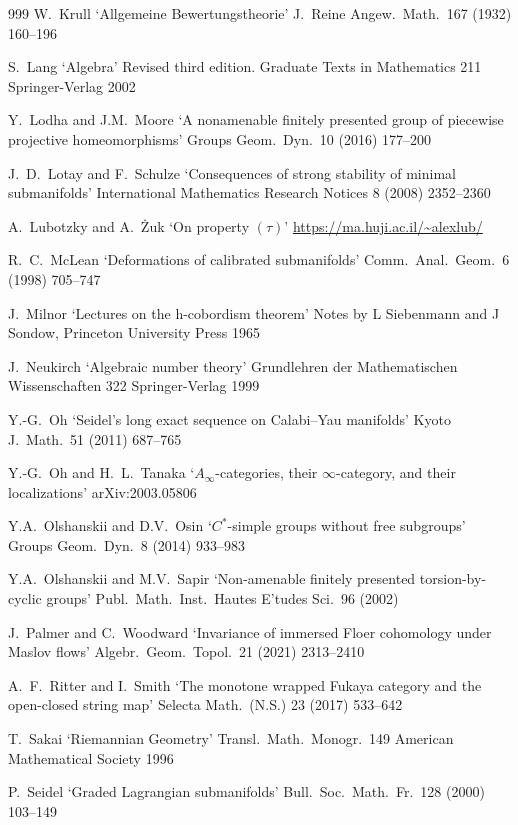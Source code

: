 \documentclass{article}
\theoremstyle{plain}%
\theoremstyle{definition}
\numberwithin{equation}{section}
\numberwithin{figure}{section}
\def\iy{\infty}
\begin{document}
\begin{thebibliography}{999}
W.\ Krull
`Allgemeine Bewertungstheorie'
J.\ Reine Angew.\ Math.\ 167 (1932) 160--196

S.\ Lang `Algebra' Revised third edition. Graduate Texts in Mathematics 211 Springer-Verlag 2002

Y.\ Lodha and J.M.\ Moore
`A nonamenable finitely presented group of piecewise projective homeomorphisms'
Groups Geom.\ Dyn.\ 10 (2016) 177--200

 J.\ D.\ Lotay and F.\ Schulze `Consequences of strong stability of minimal submanifolds' International Mathematics Research Notices 8 (2008) 2352--2360

A.\ Lubotzky and A.\ \.Zuk `On property $(\tau)$'
\url{https://ma.huji.ac.il/~alexlub/}

 R.\ C.\ McLean
`Deformations of calibrated submanifolds' Comm.\ Anal.\ Geom.\ 6 (1998) 705--747

J.\ Milnor
`Lectures on the h-cobordism theorem' Notes by L Siebenmann and J Sondow, Princeton University Press 1965

J.\ Neukirch
`Algebraic number theory'
Grundlehren der Mathematischen Wissenschaften 322 Springer-Verlag 1999

Y.-G.\ Oh
`Seidel's long exact sequence on Calabi--Yau manifolds'
Kyoto J.\ Math.\ 51 (2011) 687--765

Y.-G.\ Oh and H.\ L.\ Tanaka
`$A_\iy$-categories, their $\iy$-category, and their localizations'
arXiv:2003.05806

 Y.A.\ Olshanskii and D.V.\ Osin
`$C^*$-simple groups without free subgroups'
Groups Geom.\ Dyn.\ 8 (2014) 933--983

Y.A.\ Olshanskii and M.V.\ Sapir `Non-amenable finitely presented torsion-by-cyclic groups' Publ.\ Math.\ Inst.\ Hautes E'tudes Sci.\ 96 (2002)

  J.\ Palmer and C.\ Woodward
`Invariance of immersed Floer cohomology under Maslov flows'
Algebr.\ Geom.\ Topol.\ 21 (2021) 2313--2410

A.\ F.\ Ritter and I.\ Smith `The monotone wrapped Fukaya category and the open-closed string map' Selecta Math.\ (N.S.) 23 (2017) 533--642

T.\ Sakai `Riemannian Geometry'
Transl.\ Math.\ Monogr.\ 149
American Mathematical Society 1996 

 P.\ Seidel
`Graded Lagrangian submanifolds'
Bull.\ Soc.\ Math.\ Fr.\ 128 (2000) 103--149


\end{thebibliography}
\end{document}
